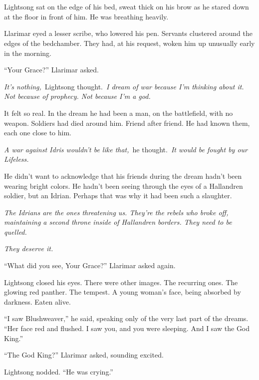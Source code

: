 \chapter{}

Lightsong sat on the edge of his bed, sweat thick on his brow as he stared down at the floor in front of him. He was breathing heavily.

Llarimar eyed a lesser scribe, who lowered his pen. Servants clustered around the edges of the bedchamber. They had, at his request, woken him up unusually early in the morning.

“Your Grace?” Llarimar asked.

\textit{It’s nothing,}~Lightsong thought.~\textit{I dream of war because I’m thinking about it. Not because of prophecy. Not because I’m a god.}

It felt so real. In the dream he had been a man, on the battlefield, with no weapon. Soldiers had died around him. Friend after friend. He had known them, each one close to him.

\textit{A war against Idris wouldn’t be like that,}~he thought.~\textit{It would be fought by our Lifeless.}

He didn’t want to acknowledge that his friends during the dream hadn’t been wearing bright colors. He hadn’t been seeing through the eyes of a Hallandren soldier, but an Idrian. Perhaps that was why it had been such a slaughter.

\textit{The Idrians are the ones threatening us. They’re the rebels who broke off, maintaining a second throne inside of Hallandren borders. They need to be quelled.}

\textit{They deserve it.}

“What did you see, Your Grace?” Llarimar asked again.

Lightsong closed his eyes. There were other images. The recurring ones. The glowing red panther. The tempest. A young woman’s face, being absorbed by darkness. Eaten alive.

“I saw Blushweaver,” he said, speaking only of the very last part of the dreams. “Her face red and flushed. I saw you, and you were sleeping. And I saw the God King.”

“The God King?” Llarimar asked, sounding excited.

Lightsong nodded. “He was crying.”

